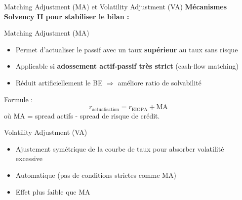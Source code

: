 \documentclass[10pt,aspectratio=169,xcolor={dvipsnames}]{beamer}
\begin{document}
\begin{frame}{Matching Adjustment (MA) et Volatility Adjustment (VA)}
\textbf{Mécanismes Solvency II pour stabiliser le bilan :}

\begin{block}{Matching Adjustment (MA)}
\begin{itemize}
    \item Permet d'actualiser le passif avec un taux \textbf{supérieur} au taux sans risque
    \item Applicable si \textbf{adossement actif-passif très strict} (cash-flow matching)
    \item Réduit artificiellement le BE $\Rightarrow$ améliore ratio de solvabilité
\end{itemize}
Formule :
\[
r_{\text{actualisation}} = r_{\text{EIOPA}} + \text{MA}
\]
où MA = spread actifs - spread de risque de crédit.
\end{block}

\vspace{0.3cm}
\begin{block}{Volatility Adjustment (VA)}
\begin{itemize}
    \item Ajustement symétrique de la courbe de taux pour absorber volatilité excessive
    \item Automatique (pas de conditions strictes comme MA)
    \item Effet plus faible que MA
\end{itemize}
\end{block}
\end{frame}
\end{document}
